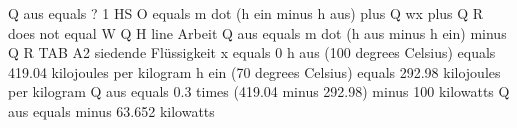 Q aus equals ?  
1 HS  
O equals m dot (h ein minus h aus) plus Q wx plus Q R does not equal W  
Q H line Arbeit  
Q aus equals m dot (h aus minus h ein) minus Q R  
TAB A2 siedende Flüssigkeit x equals 0  
h aus (100 degrees Celsius) equals 419.04 kilojoules per kilogram  
h ein (70 degrees Celsius) equals 292.98 kilojoules per kilogram  
Q aus equals 0.3 times (419.04 minus 292.98) minus 100 kilowatts  
Q aus equals minus 63.652 kilowatts